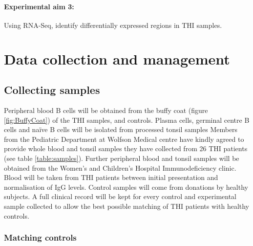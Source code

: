 \documentclass[12pt]{article}
\newcommand{\naive}{na\"{i}ve }
\begin{document}
		\paragraph{Experimental aim 3:} Using RNA-Seq, identify differentially expressed regions in THI samples.

	\section{Data collection and management}
	
		\subsection{Collecting samples}
			
			Peripheral blood B cells will be obtained from the buffy coat (figure \ref{fig:BuffyCoat}) of the THI samples, and controls. 
			Plasma cells, germinal centre B cells and \naive B cells will be isolated from processed tonsil samples
			Members from the Pediatric Department at Wolfson Medical centre have kindly agreed to provide whole blood and tonsil samples they have collected from 26 THI patients (see table \ref{table:samples}).
			Further peripheral blood and tonsil samples will be obtained from the Women's and Children's Hospital Immunodeficiency clinic. 
			Blood will be taken from THI patients between initial presentation and normalisation of IgG levels.
			Control samples will come from donations by healthy subjects. 
			A full clinical record will be kept for every control and experimental sample collected to allow the best possible matching of THI patients with healthy controls. 
		
			\subsubsection{Matching controls} 
			
\end{document}
